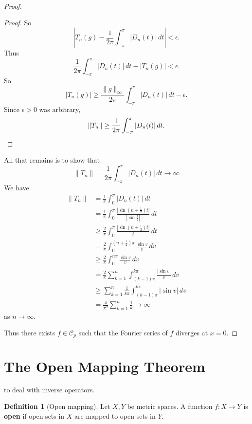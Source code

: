 \documentclass[justified]{tufte-book}
\theoremstyle{plain}%
\theoremstyle{definition}
\newtheorem{defn}[thm]{Definition}
\theoremstyle{remark}
\begin{document}
\begin{proof}
\begin{proof}
    So \[
      \left| T_n(g) - \frac{1}{2\pi} \int_{-\pi}^\pi |D_n(t)| \, dt \right| < \epsilon.
  \]  Thus \[
      \frac{1}{2\pi} \int_{-\pi}^\pi |D_n(t) | \, dt - |T_n(g)| < \epsilon.  
  \]  So \[
      |T_n(g)| \geq \frac{\| g \|_\infty}{2 \pi} \int_{-\pi}^\pi |D_n(t)| \, dt - \epsilon. 
  \]  Since $\epsilon > 0$ was arbitrary, \[
      \|T_n \| \geq \frac{1}{2 \pi} \int_{-\pi}^\pi |D_n(t) | \, dt. \qedhere
  \]
\end{proof}

All that remains is to show that \[
  \|T_n \| = \frac{1}{2\pi} \int_{-\pi}^\pi |D_n(t)| \, dt \rightarrow \infty
\]  We have 
\begin{align*}
  \|T_n \|    &= \frac{1}{\pi}\int_0^\pi |D_n(t) | \, dt \\
              &= \frac{1}{\pi} \int_0^\pi \frac{|\sin(n+\frac{1}{2})t|}{|\sin \frac{t}{2}|} \, dt \\
              &\geq \frac{2}{\pi} \int_0^\pi \frac{|\sin(n+\frac{1}{2}) t |}{t} \, dt \\
              &= \frac{2}{\pi} \int_0^{(n+\frac{1}{2})\pi} \frac{\sin v}{v} \, dv \\
              &\geq \frac{2}{\pi} \int_0^{n\pi} \frac{\sin v}{v} \, dv \\
              &= \frac{2}{\pi} \sum_{k=1}^n \int_{(k-1)\pi}^{k \pi} \frac{|\sin v|}{v} \, dv \\
              &\geq \sum_{k=1}^n \frac{1}{k \pi} \int_{(k-1)\pi}^{k \pi} |\sin v | \, dv \\
              &= \frac{4}{\pi^2} \sum_{k =1 }^n \frac{1}{k} \rightarrow \infty
\end{align*} as $n \rightarrow \infty$.  

Thus there exists $f \in \mathcal C_p$ such that the Fourier series of $f$ diverges at $x = 0$.  
\end{proof}

\section{The Open Mapping Theorem}
 to deal with inverse operators.

\begin{defn}[Open mapping]
  Let $X, Y$ be metric spaces.  A function $f : X \rightarrow Y$ is \textbf{open} if open sets in $X$ are mapped to open sets in $Y$.  
\end{defn}
\end{document}
